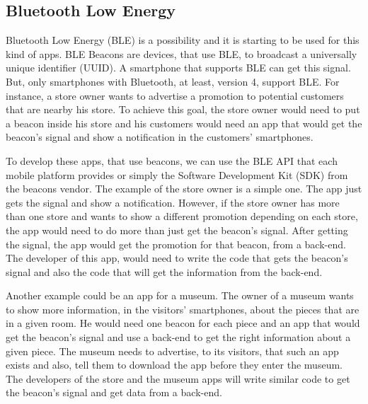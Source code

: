\subsection{Bluetooth Low Energy}
\label{sub:bluetooth_low_energy}
Bluetooth Low Energy (BLE) is a possibility 
and it is starting to be used for this kind of apps.
BLE Beacons are devices, that use BLE, to broadcast a 
universally unique identifier (UUID). A smartphone that
supports BLE can get this signal. But, only smartphones
with Bluetooth, at least, version 4, support BLE.
For instance, a store owner wants to advertise a promotion
to potential customers that are nearby his store. To 
achieve this goal, the store owner would need to put
a beacon inside his store and his customers would need an
app that would get the beacon's signal and show a 
notification in the customers' smartphones. 

To develop these apps, that use beacons, we can use the 
BLE API that each 
mobile platform provides or simply the Software
Development Kit (SDK) from the 
beacons vendor. The example of the store owner is a
simple one. The app just gets the signal and show a 
notification. However, if the store owner has more than
one store and wants to show a different promotion depending
on each store, the app would need to do more than just get
the beacon's signal. After getting the signal, the app
would get the promotion for that beacon, from a 
back-end. The developer of this app, would need to
write the code that gets the beacon's signal and also
the code that will get the information from the back-end.

Another example could be an app for a museum. The owner
of a museum wants to show more information, in the 
visitors' smartphones, about the pieces that are in a given
room. He would need one beacon for each piece and an app
that would get the beacon's signal and use a
back-end to get the right information about a given piece.
The museum needs to advertise, to its visitors, that such
an app exists and also, tell them to download the app
before they enter the museum. The developers of the
store and the museum apps will write similar code to get
the beacon's signal and get data from a back-end.

